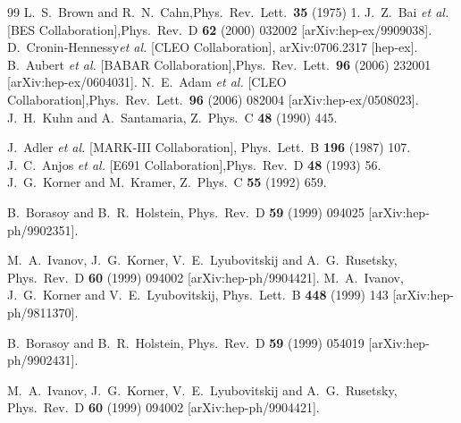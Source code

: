 \documentclass{article}
\begin{document}
\begin{thebibliography}{99}
 L.~S.~Brown and R.~N.~Cahn,Phys.\ Rev.\ Lett.\  {\bf 35} (1975) 1.%
 J.~Z.~Bai {\it et al.}  [BES Collaboration],Phys.\ Rev.\  D {\bf 62} (2000) 032002 [arXiv:hep-ex/9909038].%
 D.~Cronin-Hennessy{\it et al.} [CLEO Collaboration], arXiv:0706.2317 [hep-ex].%
 B.~Aubert {\it et al.}  [BABAR Collaboration],Phys.\ Rev.\ Lett.\  {\bf 96} (2006) 232001 [arXiv:hep-ex/0604031].%
 N.~E.~Adam {\it et al.}  [CLEO Collaboration],Phys.\ Rev.\ Lett.\  {\bf 96} (2006) 082004 [arXiv:hep-ex/0508023].%
 J.~H.~Kuhn and A.~Santamaria,
Z.\ Phys.\  C {\bf 48} (1990) 445.

 J.~Adler {\it et al.} [MARK-III Collaboration], Phys.\ Lett.\  B {\bf 196} (1987) 107.
 J.~C.~Anjos {\it et al.}  [E691 Collaboration],Phys.\ Rev.\  D {\bf 48} (1993) 56.
J.~G.~Korner and M.~Kramer,
Z.\ Phys.\  C {\bf 55} (1992) 659.

B.~Borasoy and B.~R.~Holstein,
Phys.\ Rev.\  D {\bf 59} (1999) 094025 [arXiv:hep-ph/9902351].

M.~A.~Ivanov, J.~G.~Korner, V.~E.~Lyubovitskij and A.~G.~Rusetsky,
Phys.\ Rev.\  D {\bf 60} (1999) 094002
[arXiv:hep-ph/9904421].
M.~A.~Ivanov, J.~G.~Korner and V.~E.~Lyubovitskij,
Phys.\ Lett.\  B {\bf 448} (1999) 143 [arXiv:hep-ph/9811370].

B.~Borasoy and B.~R.~Holstein,
Phys.\ Rev.\  D {\bf 59} (1999) 054019 [arXiv:hep-ph/9902431].

M.~A.~Ivanov, J.~G.~Korner, V.~E.~Lyubovitskij and A.~G.~Rusetsky,
Phys.\ Rev.\  D {\bf 60} (1999) 094002
[arXiv:hep-ph/9904421].

\end{thebibliography}
\end{document}
